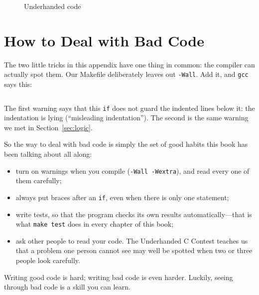 \begin{figure}[htbp]
  \centering
  \caption{Underhanded code}
  \label{fig:underhanded}
\end{figure}

\section{How to Deal with Bad Code}

The two little tricks in this appendix have one thing in common: the compiler can actually spot them. Our Makefile deliberately leaves out \texttt{-Wall}. Add it, and \texttt{gcc} says this:
\inputminted[linenos=false, fontsize=\scriptsize]{text}{code/en/appc/out/wall.txt}

The first warning says that this \texttt{if} does not guard the indented lines below it: the indentation is lying (``misleading indentation''). The second is the same warning we met in Section~\ref{sec:logic}.

So the way to deal with bad code is simply the set of good habits this book has been talking about all along:
\begin{itemize}
  \item turn on warnings when you compile (\texttt{-Wall -Wextra}), and read every one of them carefully;
  \item always put braces after an \texttt{if}, even when there is only one statement;
  \item write tests, so that the program checks its own results automatically---that is what \texttt{make test} does in every chapter of this book;
  \item ask other people to read your code. The Underhanded C Contest teaches us that a problem one person cannot see may well be spotted when two or three people look carefully.
\end{itemize}

Writing good code is hard; writing bad code is even harder. Luckily, seeing through bad code is a skill you can learn.
